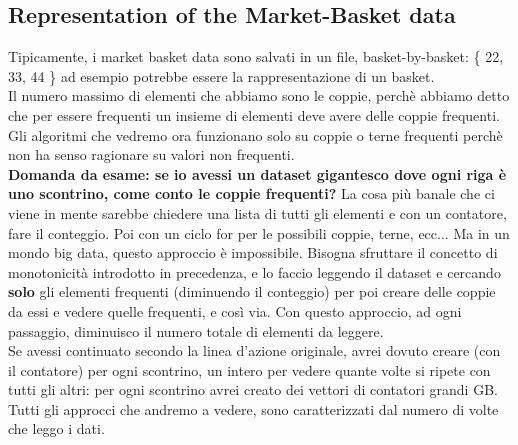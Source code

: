 \subsection{Representation of the Market-Basket data}
Tipicamente, i market basket data sono salvati in un file, basket-by-basket: \{ 22, 33, 44 \} ad esempio potrebbe essere la rappresentazione di un basket. 
\\
Il numero massimo di elementi che abbiamo sono le coppie, perchè abbiamo detto che per essere frequenti un insieme di elementi deve avere delle coppie frequenti. Gli algoritmi che vedremo ora funzionano solo su coppie o terne frequenti perchè non ha senso ragionare su valori non frequenti. 
\\
\textbf{Domanda da esame: se io avessi un dataset gigantesco dove ogni riga è uno scontrino, come conto le coppie frequenti?} La cosa più banale che ci viene in mente sarebbe chiedere una lista di tutti gli elementi e con un contatore, fare il conteggio. Poi con un ciclo for per le possibili coppie, terne, ecc... Ma in un mondo big data, questo approccio è impossibile. Bisogna sfruttare il concetto di monotonicità introdotto in precedenza, e lo faccio leggendo il dataset e cercando \textbf{solo} gli elementi frequenti (diminuendo il conteggio) per poi creare delle coppie da essi e vedere quelle frequenti, e così via. Con questo approccio, ad ogni passaggio, diminuisco il numero totale di elementi da leggere. 
\\
Se avessi continuato secondo la linea d'azione originale, avrei dovuto creare (con il contatore) per ogni scontrino, un intero per vedere quante volte si ripete con tutti gli altri: per ogni scontrino avrei creato dei vettori di contatori grandi GB.
\\
Tutti gli approcci che andremo a vedere, sono caratterizzati dal numero di volte che leggo i dati.

